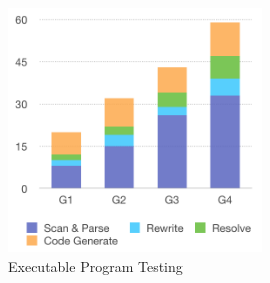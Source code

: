 \begin{figure}[h!] 
\centering    
\includegraphics[width=0.6\textwidth]{ExecutableProgram}
\caption{Executable Program Testing}
\label{fig:ExecutableProgram}
\end{figure}